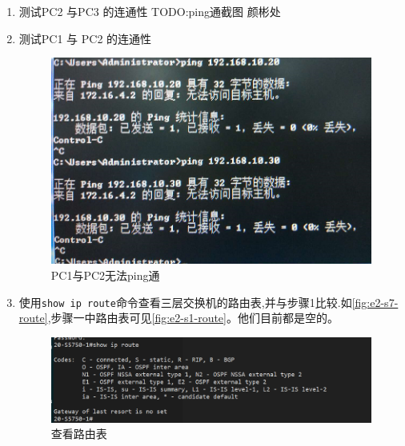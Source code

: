 \documentclass{myreport}
\begin{document}
\begin{enumerate}
    \item 测试PC2 与PC3 的连通性
    TODO:ping通截图 颜彬处

    \item 测试PC1 与 PC2 的连通性
    
        \begin{figure}[htp]
            \centering
            \includegraphics[width=13cm]{"./figure/2018-05-17-22-58-38.png"}
            \caption{PC1与PC2无法ping通}
            \label{fig:e2-s7-pc1-ping-pc3}
        \end{figure}
        
    \item 使用\texttt{show ip route}命令查看三层交换机的路由表,并与步骤1比较.如\autoref{fig:e2-s7-route},步骤一中路由表可见\autoref{fig:e2-s1-route}。他们目前都是空的。
    \begin{figure}[htp]
        \centering
        \includegraphics[width=13cm]{"./figure/2018-05-17-17-16-01.png"}
        \caption{查看路由表}
        \label{fig:e2-s7-route}
    \end{figure}
    
    
\end{enumerate}
\end{document}
